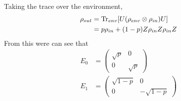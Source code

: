 Taking the trace over the environment,
\begin{align}
    \rho_{out} &= \Tr_{env}[U(\rho_{env} \otimes \rho_{in})U] \\
    &= p \rho_{in} + (1-p)Z\rho_{in}Z\rho_{in}Z
\end{align}
From this were can see that 
\begin{align}
    E_0 &= \begin{pmatrix}\sqrt{p} & 0 \\ 0 & \sqrt{p} \end{pmatrix}\\ 
    E_1 &= \begin{pmatrix}\sqrt{1-p} & 0 \\ 0 & -\sqrt{1-p} \end{pmatrix}
\end{align}



\newpage
